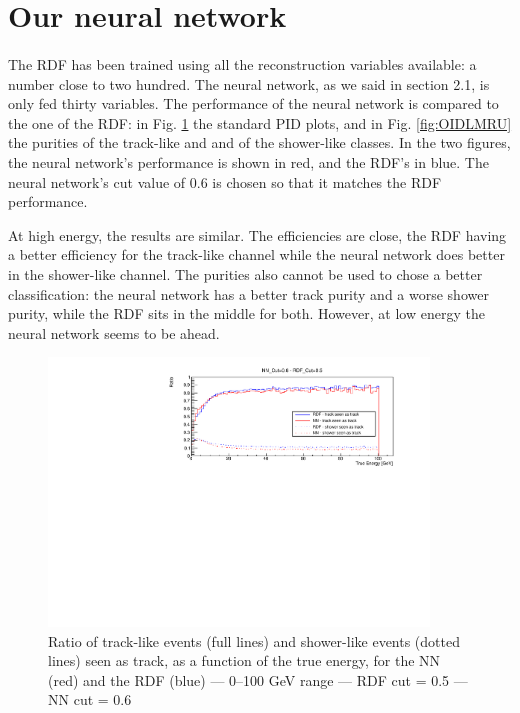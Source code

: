 \newpage
\section{Our neural network}

\paragraph{}
The RDF has been trained using all the reconstruction variables available: a number close to two hundred. The neural network, as we said in section 2.1, is only fed thirty variables. The performance of the neural network is compared to the one of the RDF: in Fig. \ref{fig:INLDN} the standard PID plots, and in Fig. \ref{fig:OIDLMRU} the purities of the track-like and and of the shower-like classes. In the two figures, the neural network's performance is shown in red, and the RDF's in blue. The neural network's cut value of 0.6 is chosen so that it matches the RDF performance.

At high energy, the results are similar. The efficiencies are close, the RDF having a better efficiency for the track-like channel while the neural network does better in the shower-like channel. The purities also cannot be used to chose a better classification: the neural network has a better track purity and a worse shower purity, while the RDF sits in the middle for both. However, at low energy the neural network seems to be ahead.

\begin{figure}[!h]
    \centering
    \includegraphics[width=0.9\textwidth]{fig/PID_Efficiency_RDF_CUT_0_5_VS_NN_CUT_0_6_E_cut_100.pdf}
    \caption{Ratio of track-like events (full lines) and shower-like events (dotted lines) seen as track, as a function of the true energy, for the NN (red) and the RDF (blue)  --- 0--100 GeV range --- RDF cut = 0.5 --- NN cut = 0.6}
    \label{fig:INLDN}
\end{figure}

